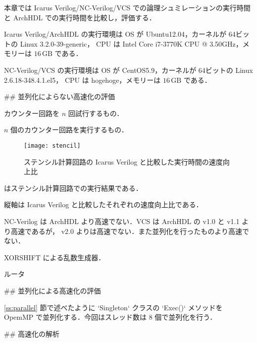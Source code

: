 本章では Icarus Verilog/NC-Verilog/VCS での論理シュミレーションの実行時間と
ArchHDL での実行時間を比較し，評価する．

Icarus Verilog/ArchHDL の実行環境は OS が Ubuntu12.04，カーネルが 64ビットの
Linux 3.2.0-39-generic， CPU は
Intel Core i7-3770K CPU @ 3.50GHz，メモリーは
$16\,\mathrm{GB}$ である．

NC-Verilog/VCS の実行環境は OS が CentOS5.9，カーネルが 64ビットの
Linux 2.6.18-348.4.1.el5， CPU は
hogehoge，メモリーは
$16\,\mathrm{GB}$ である．


## 並列化によらない高速化の評価

カウンター回路を $n$ 回試行するもの．

$n$ 個のカウンター回路を実行するもの．

\begin{figure}[t]
 \centering
 \texttt{[image: stencil]}
 \caption{ステンシル計算回路の Icarus Verilog と比較した実行時間の速度向上比}
 \label{fig:stencil}
\end{figure}

 はステンシル計算回路での実行結果である．

縦軸は Icarus Verilog と比較したそれぞれの速度向上比である．

NC-Verilog は ArchHDL より高速でない．VCS は ArchHDL の v1.0 と v1.1 より高速であるが， v2.0 よりは高速でない．また並列化を行ったものより高速でない．





XORSHIFT による乱数生成器．




ルータ





## 並列化による高速化の評価

\ref{ss:parallel} 節で述べたように `Singleton` クラスの `Exec()`
メソッドを OpemMP で並列化する．今回はスレッド数は 8 個で並列化を行う．







## 高速化の解析








